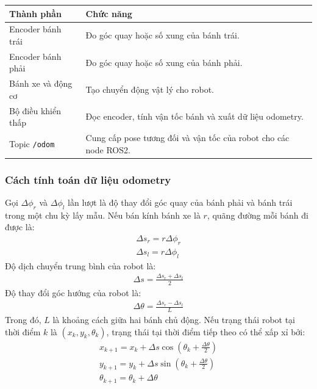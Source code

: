 \renewcommand{\arraystretch}{1.25}
\begin{longtable}{|
  >{\raggedright\arraybackslash}p{}|
  >{\raggedright\arraybackslash}p{}|}
\hline
\textbf{Thành phần} & \textbf{Chức năng} \\ \hline
\hline
\endhead
\hline
\endlastfoot
Encoder bánh trái & Đo góc quay hoặc số xung của bánh trái. \\ \hline
Encoder bánh phải & Đo góc quay hoặc số xung của bánh phải. \\ \hline
Bánh xe và động cơ & Tạo chuyển động vật lý cho robot. \\ \hline
Bộ điều khiển thấp & Đọc encoder, tính vận tốc bánh và xuất dữ liệu
odometry. \\ \hline
Topic \texttt{/odom} & Cung cấp pose tương đối và vận tốc của
robot cho các node ROS2. \\ \hline
\end{longtable}

\subsubsection{Cách tính toán dữ liệu odometry}

Gọi \(\Delta\phi_{r}\) và \(\Delta\phi_{l}\) lần lượt là độ thay đổi góc
quay của bánh phải và bánh trái trong một chu kỳ lấy mẫu. Nếu bán kính
bánh xe là \(r\), quãng đường mỗi bánh đi được là:
\begin{gather*}\Delta s_{r} = r\Delta\phi_{r} \\[1.5ex]
\Delta s_{l} = r\Delta\phi_{l}\end{gather*}
Độ dịch chuyển trung bình của robot là:
\begin{gather*}\Delta s = \frac{\Delta s_{r} + \Delta s_{l}}{2}\end{gather*}
Độ thay đổi góc hướng của robot là:
\begin{gather*}\Delta\theta = \frac{\Delta s_{r} - \Delta s_{l}}{L}\end{gather*}
Trong đó, \(L\) là khoảng cách giữa hai bánh chủ động. Nếu trạng thái
robot tại thời điểm \(k\) là \(\left( x_{k},y_{k},\theta_{k} \right)\),
trạng thái tại thời điểm tiếp theo có thể xấp xỉ bởi:
\begin{gather*}x_{k + 1} = x_{k} + \Delta s\cos\left( \theta_{k} + \frac{\Delta\theta}{2} \right) \\[1.5ex]
y_{k + 1} = y_{k} + \Delta s\sin\left( \theta_{k} + \frac{\Delta\theta}{2} \right) \\[1.5ex]
\theta_{k + 1} = \theta_{k} + \Delta\theta\end{gather*}
